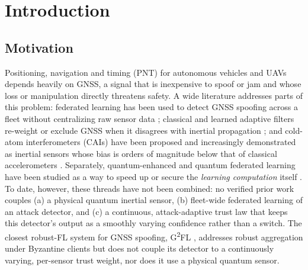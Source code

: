 \documentclass[journal]{IEEEtran}
\begin{document}
\section{Introduction}

\subsection{Motivation}
Positioning, navigation and timing (PNT) for autonomous vehicles and UAVs depends heavily on GNSS, a
signal that is inexpensive to spoof or jam and whose loss or manipulation directly threatens safety.
A wide literature addresses parts of this problem: federated learning has been used to detect GNSS
spoofing across a fleet without centralizing raw sensor data \cite{khan2025enhancing,chai2025navigation,liu2026g2fl,namagembe2026machine,zhou2023spatiotemporal};
classical and learned adaptive filters re-weight or exclude GNSS when it disagrees with inertial
propagation \cite{mehra1970identification,carlson1988federated,carlson1990federated,ren2020adaptive,pardhasaradhi2022gps,negru2024resilient};
and cold-atom interferometers (CAIs) have been proposed and increasingly demonstrated as inertial
sensors whose bias is orders of magnitude below that of classical accelerometers
\cite{wright2022cold,darmagnac2024atom}. Separately, quantum-enhanced and quantum federated learning
have been studied as a way to speed up or secure the \emph{learning computation} itself
\cite{hazarika2025quantum,chehimi2023foundations,chehimi2022quantum}. To date, however, these threads
have not been combined: no verified prior work couples (a) a physical quantum inertial sensor, (b)
fleet-wide federated learning of an attack detector, and (c) a continuous, attack-adaptive trust law
that keeps this detector's output as a smoothly varying confidence rather than a switch. The closest
robust-FL system for GNSS spoofing, G\textsuperscript{2}FL \cite{liu2026g2fl}, addresses robust
aggregation under Byzantine clients but does not couple its detector to a continuously varying,
per-sensor trust weight, nor does it use a physical quantum sensor.
\end{document}
